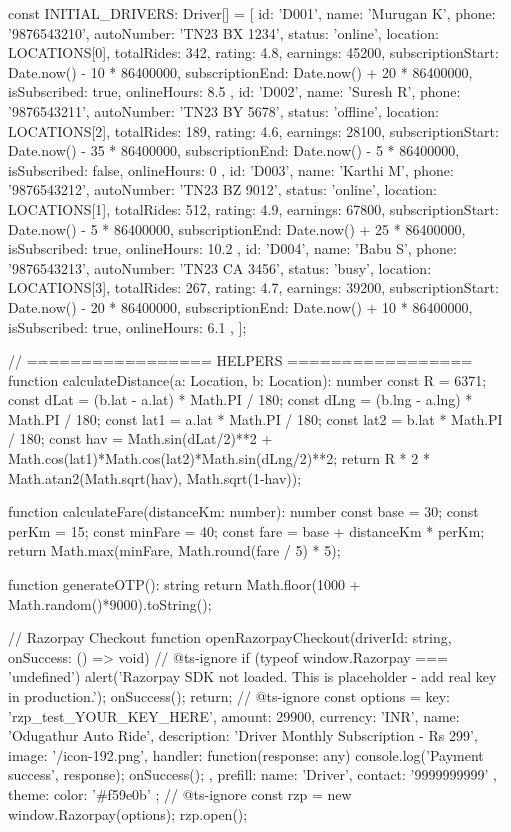 const INITIAL_DRIVERS: Driver[] = [
  {
    id: 'D001', name: 'Murugan K', phone: '9876543210', autoNumber: 'TN23 BX 1234',
    status: 'online', location: LOCATIONS[0], totalRides: 342, rating: 4.8, earnings: 45200,
    subscriptionStart: Date.now() - 10 * 86400000, subscriptionEnd: Date.now() + 20 * 86400000,
    isSubscribed: true, onlineHours: 8.5
  },
  {
    id: 'D002', name: 'Suresh R', phone: '9876543211', autoNumber: 'TN23 BY 5678',
    status: 'offline', location: LOCATIONS[2], totalRides: 189, rating: 4.6, earnings: 28100,
    subscriptionStart: Date.now() - 35 * 86400000, subscriptionEnd: Date.now() - 5 * 86400000,
    isSubscribed: false, onlineHours: 0
  },
  {
    id: 'D003', name: 'Karthi M', phone: '9876543212', autoNumber: 'TN23 BZ 9012',
    status: 'online', location: LOCATIONS[1], totalRides: 512, rating: 4.9, earnings: 67800,
    subscriptionStart: Date.now() - 5 * 86400000, subscriptionEnd: Date.now() + 25 * 86400000,
    isSubscribed: true, onlineHours: 10.2
  },
  {
    id: 'D004', name: 'Babu S', phone: '9876543213', autoNumber: 'TN23 CA 3456',
    status: 'busy', location: LOCATIONS[3], totalRides: 267, rating: 4.7, earnings: 39200,
    subscriptionStart: Date.now() - 20 * 86400000, subscriptionEnd: Date.now() + 10 * 86400000,
    isSubscribed: true, onlineHours: 6.1
  },
];

// ================= HELPERS =================
function calculateDistance(a: Location, b: Location): number {
  const R = 6371;
  const dLat = (b.lat - a.lat) * Math.PI / 180;
  const dLng = (b.lng - a.lng) * Math.PI / 180;
  const lat1 = a.lat * Math.PI / 180;
  const lat2 = b.lat * Math.PI / 180;
  const hav = Math.sin(dLat/2)**2 + Math.cos(lat1)*Math.cos(lat2)*Math.sin(dLng/2)**2;
  return R * 2 * Math.atan2(Math.sqrt(hav), Math.sqrt(1-hav));
}

function calculateFare(distanceKm: number): number {
  const base = 30;
  const perKm = 15;
  const minFare = 40;
  const fare = base + distanceKm * perKm;
  return Math.max(minFare, Math.round(fare / 5) * 5);
}

function generateOTP(): string {
  return Math.floor(1000 + Math.random()*9000).toString();
}

// Razorpay Checkout
function openRazorpayCheckout(driverId: string, onSuccess: () => void) {
  // @ts-ignore
  if (typeof window.Razorpay === 'undefined') {
    alert('Razorpay SDK not loaded. This is placeholder - add real key in production.');
    onSuccess();
    return;
  }
  // @ts-ignore
  const options = {
    key: 'rzp_test_YOUR_KEY_HERE',
    amount: 29900,
    currency: 'INR',
    name: 'Odugathur Auto Ride',
    description: 'Driver Monthly Subscription - Rs 299',
    image: '/icon-192.png',
    handler: function(response: any) {
      console.log('Payment success', response);
      onSuccess();
    },
    prefill: { name: 'Driver', contact: '9999999999' },
    theme: { color: '#f59e0b' }
  };
  // @ts-ignore
  const rzp = new window.Razorpay(options);
  rzp.open();
}

